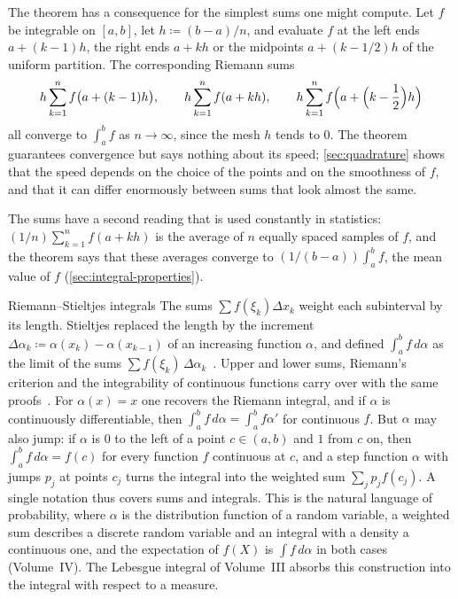 The theorem has a consequence for the simplest sums one might compute. Let $f$ be integrable on $[a,b]$, let $h\coloneqq(b-a)/n$, and evaluate $f$ at the left ends $a+(k-1)h$, the right ends $a+kh$ or the midpoints $a+(k-1/2)h$ of the uniform partition. The corresponding Riemann sums
\[
h\sum_{k=1}^nf\bigl(a+(k-1)h\bigr),\qquad h\sum_{k=1}^nf(a+kh),\qquad h\sum_{k=1}^nf\Bigl(a+\Bigl(k-\frac12\Bigr)h\Bigr)
\]
all converge to $\int_a^bf$ as $n\to\infty$, since the mesh $h$ tends to $0$. The theorem guarantees convergence but says nothing about its speed; \cref{sec:quadrature} shows that the speed depends on the choice of the points and on the smoothness of $f$, and that it can differ enormously between sums that look almost the same.

The sums have a second reading that is used constantly in statistics: $(1/n)\sum_{k=1}^nf(a+kh)$ is the average of $n$ equally spaced samples of $f$, and the theorem says that these averages converge to $(1/(b-a))\int_a^bf$, the mean value of $f$ (\cref{sec:integral-properties}).

\begin{note}{Riemann--Stieltjes integrals}
The sums $\sum f(\xi_k)\Delta x_k$ weight each subinterval by its length. Stieltjes replaced the length by the increment $\Delta\alpha_k\coloneqq\alpha(x_k)-\alpha(x_{k-1})$ of an increasing function $\alpha$, and defined $\int_a^bf\,d\alpha$ as the limit of the sums $\sum f(\xi_k)\,\Delta\alpha_k$~\cite{stieltjes1894}. Upper and lower sums, Riemann's criterion and the integrability of continuous functions carry over with the same proofs~\cite{rudin1976}. For $\alpha(x)=x$ one recovers the Riemann integral, and if $\alpha$ is continuously differentiable, then $\int_a^bf\,d\alpha=\int_a^bf\alpha'$ for continuous $f$. But $\alpha$ may also jump: if $\alpha$ is $0$ to the left of a point $c\in(a,b)$ and $1$ from $c$ on, then $\int_a^bf\,d\alpha=f(c)$ for every function $f$ continuous at $c$, and a step function $\alpha$ with jumps $p_j$ at points $c_j$ turns the integral into the weighted sum $\sum_jp_jf(c_j)$. A single notation thus covers sums and integrals. This is the natural language of probability, where $\alpha$ is the distribution function of a random variable, a weighted sum describes a discrete random variable and an integral with a density a continuous one, and the expectation of $f(X)$ is $\int f\,d\alpha$ in both cases (Volume~IV). The Lebesgue integral of Volume~III absorbs this construction into the integral with respect to a measure.
\end{note}

